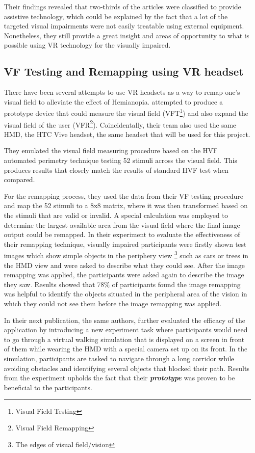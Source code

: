 \documentclass{l4proj}
\begin{document}
Their findings revealed that two-thirds of the articles were classified to provide assistive technology, which could be explained by the fact that a lot of the targeted visual impairments were not easily treatable using external equipment. Nonetheless, they still provide a great insight and areas of opportunity to what is possible using VR technology for the visually impaired.

\subsection{VF Testing and Remapping using VR headset}
There have been several attempts to use VR headsets as a way to remap one's visual field to alleviate the effect of Hemianopia. \cite{Sayed2020ExpansionSpectacles} attempted to produce a prototype device that could measure the visual field (VFT\footnote{Visual Field Testing}) and also expand the visual field of the user (VFR\footnote{Visual Field Remapping}). Coincidentally, their team also used the same HMD, the HTC Vive headset, the same headset that will be used for this project. 

They emulated the visual field measuring procedure based on the HVF automated perimetry technique testing 52 stimuli across the visual field. This produces results that closely match the results of standard HVF test when compared. 

For the remapping process, they used the data from their VF testing procedure and map the 52 stimuli to a 8x8 matrix, where it was then transformed based on the stimuli that are valid or invalid. A special calculation was employed to determine the largest available area from the visual field where the final image output could be remapped. In their experiment to evaluate the effectiveness of their remapping technique, visually impaired participants were firstly shown test images which show simple objects in the periphery view \footnote{The edges of visual field/vision} such as cars or trees in the HMD view and were asked to describe what they could see. After the image remapping was applied, the participants were asked again to describe the image they saw. Results showed that 78\% of participants found the image remapping was helpful to identify the objects situated in the peripheral area of the vision in which they could not see them before the image remapping was applied.

In their next publication, the same authors, \cite{Sayed2020ExpansionSpectacles} further evaluated the efficacy of the application by introducing a new experiment task where participants would need to go through a virtual walking simulation that is displayed on a screen in front of them while wearing the HMD with a special camera set up on its front. In the simulation, participants are tasked to navigate through a long corridor while avoiding obstacles and identifying several objects that blocked their path. Results from the experiment upholds the fact that their \textbf{\textit{prototype}} was proven to be beneficial to the participants. 
\end{document}
